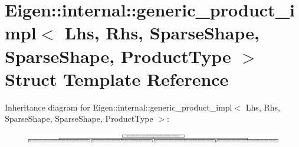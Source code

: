 \hypertarget{struct_eigen_1_1internal_1_1generic__product__impl_3_01_lhs_00_01_rhs_00_01_sparse_shape_00_01_s0f15bf86456099378e4a76f37323e721}{}\section{Eigen\+:\+:internal\+:\+:generic\+\_\+product\+\_\+impl$<$ Lhs, Rhs, Sparse\+Shape, Sparse\+Shape, Product\+Type $>$ Struct Template Reference}
\label{struct_eigen_1_1internal_1_1generic__product__impl_3_01_lhs_00_01_rhs_00_01_sparse_shape_00_01_s0f15bf86456099378e4a76f37323e721}
Inheritance diagram for Eigen\+:\+:internal\+:\+:generic\+\_\+product\+\_\+impl$<$ Lhs, Rhs, Sparse\+Shape, Sparse\+Shape, Product\+Type $>$\+:\begin{figure}[H]
\begin{center}
\leavevmode
\includegraphics[height=0.458265cm]{struct_eigen_1_1internal_1_1generic__product__impl_3_01_lhs_00_01_rhs_00_01_sparse_shape_00_01_s0f15bf86456099378e4a76f37323e721}
\end{center}
\end{figure}
